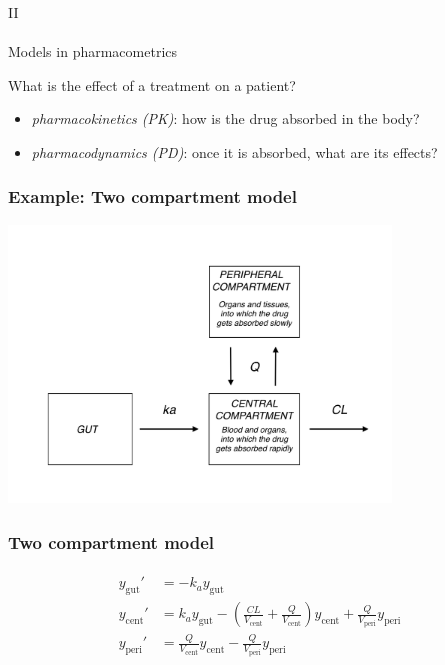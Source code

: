 \documentclass[xcolor=table]{beamer}
\begin{document}
 

\begin{frame}
  \begin{center}
    {\Large II} \\ \ \\ Models in pharmacometrics
  \end{center}
\end{frame}

\begin{frame}
  What is the effect of a treatment on a patient?
  \begin{itemize}
    \item \textit{pharmacokinetics (PK)}: how is the drug absorbed in the body?
    \item \textit{pharmacodynamics (PD)}: once it is absorbed, what are its effects? 
  \end{itemize}
\end{frame}

\begin{frame}
  \frametitle{Example: Two compartment model}
  
  \begin{center}
    \includegraphics[width=4in]{../figures/TwoCptNice.png}
  \end{center}
 
\end{frame}

\begin{frame}
  \frametitle{Two compartment model}
  
  \begin{eqnarray*}
  \begin{aligned}
  y_\mathrm{gut}' &= -k_a y_\mathrm{gut} \\
  y_\mathrm{cent}' &= k_a y_\mathrm{gut} - \left(\frac{CL}{V_\mathrm{cent}} + \frac{Q}{V_\mathrm{cent}} \right) y_\mathrm{cent} +  \frac{Q}{V_\mathrm{peri}} y_\mathrm{peri} \\
  y_\mathrm{peri}' &= \frac{Q}{V_\mathrm{cent}} y_\mathrm{cent} - \frac{Q}{V_\mathrm{peri}} y_\mathrm{peri}
  \end{aligned}
  \label{eq:2Cpt}
\end{eqnarray*}

\end{frame}
\end{document}
